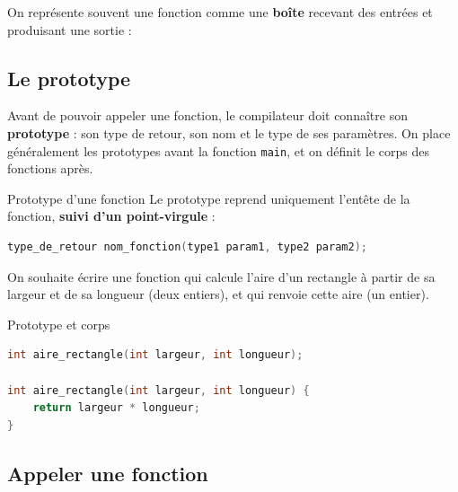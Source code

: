 On représente souvent une fonction comme une \textbf{boîte} recevant des entrées et produisant une sortie :
\begin{center}
\end{center}

\subsection{Le prototype}

Avant de pouvoir appeler une fonction, le compilateur doit connaître son \textbf{prototype} : son type de retour, son nom et le type de ses paramètres. On place généralement les prototypes avant la fonction \texttt{main}, et on définit le corps des fonctions après.

\begin{UPSTIinfor}{Prototype d'une fonction}
  Le prototype reprend uniquement l'entête de la fonction, \textbf{suivi d'un point-virgule} :
  \begin{lstlisting}[language=c,caption={Exemple de prototype}]
type_de_retour nom_fonction(type1 param1, type2 param2);
\end{lstlisting}
\end{UPSTIinfor}

\begin{UPSTIactivite}
On souhaite écrire une fonction qui calcule l'aire d'un rectangle à partir de sa largeur et de sa longueur (deux entiers), et qui renvoie cette aire (un entier).

\end{UPSTIactivite}

\begin{UPSTIprofOnlyEnv}
\begin{UPSTIcorrectionP}{Prototype et corps}
\begin{lstlisting}[language=c,caption={Correction}]
int aire_rectangle(int largeur, int longueur);

int aire_rectangle(int largeur, int longueur) {
    return largeur * longueur;
}
\end{lstlisting}
\end{UPSTIcorrectionP}
\end{UPSTIprofOnlyEnv}

\subsection{Appeler une fonction}

